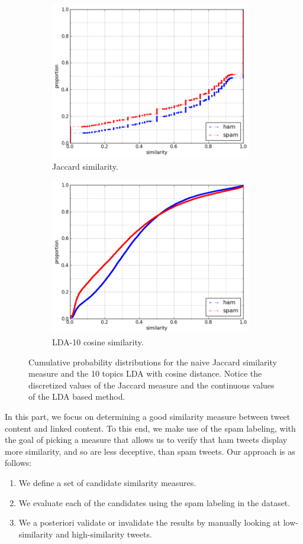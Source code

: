 \documentclass[times, 11pt, twocolumn]{article}
\begin{document}
\begin{figure}[ht]\centering
	\begin{subfigure}[c]{8.8cm}
	\includegraphics[width=8.8cm]{jacc_max.png}
	\caption{Jaccard similarity.}
	\end{subfigure}
	\begin{subfigure}[c]{8.8cm}
	\includegraphics[width=8.8cm]{cosine_lda10_max.png}
	\caption{LDA-10 cosine similarity.}
	\end{subfigure}
	\caption{Cumulative probability distributions for the
		naive Jaccard similarity measure and the 10 topics LDA
		with cosine distance. Notice the discretized values of the
		Jaccard measure and the continuous values of the LDA
	based method.}
	\label{cdfs}
\end{figure}

In this part, we focus on determining a good similarity measure between tweet content and linked content.
To this end, we make use of the spam labeling, with the goal of picking a measure that allows us to 
verify that ham tweets display more similarity, and so are less deceptive, than spam tweets.
Our approach is as follows:
\begin{enumerate}
	\item We define a set of candidate similarity measures.
	\item We evaluate each of the candidates using the spam labeling in the dataset.
	\item We a posteriori validate or invalidate the results by manually looking at low-similarity and high-similarity tweets.
\end{enumerate}
\end{document}

